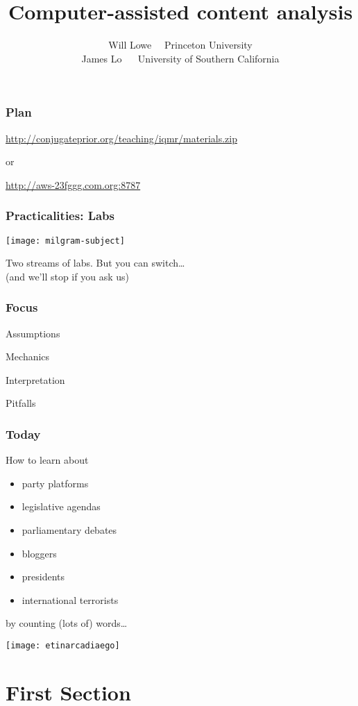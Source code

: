 \documentclass[11pt,compress,professionalfonts]{beamer}
\title{Computer-assisted content analysis}
\author{Will Lowe ~~Princeton University\\James Lo ~~ University of Southern California}
\institute{IQMR 2016 Syracuse}
\newcommand{\ita}{\begin{itemize}}
\newcommand{\itm}{\item[]}
\newcommand{\itz}{\end{itemize}}
\begin{document}
\maketitle

\begin{frame}[t,fragile]\frametitle{Plan}

\end{frame}

\begin{frame}[standout]
\url{http://conjugateprior.org/teaching/iqmr/materials.zip}

or 

\url{http://aws-23fggg.com.org:8787}

\end{frame}

\begin{frame}[t,fragile]\frametitle{Practicalities: Labs}

\centerline{\texttt{[image: milgram-subject]}}

Two streams of labs.  But you can switch\ldots\\ (and we'll stop if you ask us)


\end{frame}
\begin{frame}[t,fragile]\frametitle{Focus}

Assumptions

Mechanics

Interpretation

Pitfalls


%


\end{frame}
\begin{frame}[t,fragile]\frametitle{Today}
How to learn about
\ita
\itm party platforms
\itm legislative agendas
\itm parliamentary debates
\itm bloggers
\itm presidents
\itm international terrorists
\itz
by counting (lots of) words\ldots

\end{frame}
\begin{frame}[standout]

\texttt{[image: etinarcadiaego]}

\end{frame}



\section{First Section}
\end{document}
